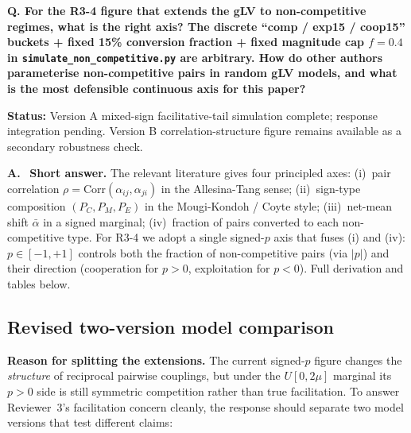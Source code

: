 \documentclass[11pt]{article}
\newcommand{\question}[1]{%
    \par\vspace{0.4em}\noindent%
    {\color{blue!70!black}\textbf{Q. #1}}\par\smallskip%
}
\newcommand{\answerlabel}{\par\noindent\textbf{A.}\ }
\newcommand{\statusmark}[1]{{\color{red!70!black}\textbf{Status:} #1}\par}
\begin{document}
\question{For the R3-4 figure that extends the gLV to non-competitive regimes, what is the right axis? The discrete ``comp / exp15 / coop15'' buckets + fixed 15\% conversion fraction + fixed magnitude cap $f=0.4$ in \texttt{simulate\_non\_competitive.py} are arbitrary. How do other authors parameterise non-competitive pairs in random gLV models, and what is the most defensible continuous axis for this paper?}
\statusmark{Version A mixed-sign facilitative-tail simulation complete; response integration pending. Version B correlation-structure figure remains available as a secondary robustness check.}

\answerlabel
\textbf{Short answer.} The relevant literature gives four principled axes: (i)~pair correlation $\rho = \mathrm{Corr}(\alpha_{ij}, \alpha_{ji})$ in the Allesina-Tang sense; (ii)~sign-type composition $(P_C, P_M, P_E)$ in the Mougi-Kondoh / Coyte style; (iii)~net-mean shift $\bar\alpha$ in a signed marginal; (iv)~fraction of pairs converted to each non-competitive type. For R3-4 we adopt a single signed-$p$ axis that fuses (i) and (iv): $p \in [-1, +1]$ controls both the fraction of non-competitive pairs (via $|p|$) and their direction (cooperation for $p > 0$, exploitation for $p < 0$). Full derivation and tables below.

\subsection*{Revised two-version model comparison}

\noindent\textbf{Reason for splitting the extensions.}
The current signed-$p$ figure changes the \emph{structure} of reciprocal pairwise couplings, but under the $U[0,2\mu]$ marginal its $p>0$ side is still symmetric competition rather than true facilitation. To answer Reviewer~3's facilitation concern cleanly, the response should separate two model versions that test different claims:
\end{document}

